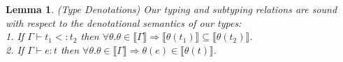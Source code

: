 \documentclass[11pt]{article}
\newtheorem{lemma}[theorem]{Lemma}
\newcommand{\bind}{\hspace{0.1em}{:}\hspace{0.1em}} %
\newcommand{\col}{\mathbin{:}}       %
\newcommand{\lb}{\llbracket}         %
\newcommand{\rb}{\rrbracket}         %
\newcommand{\many}{\hookrightarrow^*}
\newcommand{\true}{\mathtt{true}}
\begin{document}
\begin{lemma}{ (Type Denotations) Our typing and subtyping relations are sound with respect to the denotational semantics of our types:\\
1. If $\Gamma \vdash t_1 <: t_2$ then $\forall \theta. \theta \in \lb \Gamma \rb \Rightarrow \lb\theta(t_1)\rb \subseteq \lb\theta(t_2)\rb$.\\
2. If $\Gamma \vdash e : t$ then $\forall \theta. \theta \in \lb \Gamma \rb \Rightarrow \theta(e) \in \lb\theta(t)\rb.$
}	
\end{lemma}

\begin{comment}
\begin{proof}
(1) Suppose $\Gamma \vdash t_1 <: t_2$. We proceed by induction on the derivation tree of the subtyping relation.

{\bf Case} $\textsc{Sub-Base}$: We have that 
$\Gamma \vdash b\{v_1\col p_1\} <: b\{v_2\col p_2\}$ where $t_1 \equiv b\{v_1\col p_1\}$ and $t_2 \equiv b\{v_2\col p_2\}$.
By inversion, 
\[\Gamma; v_1\bind b\{v_1\col p_1\} \vdash p_2[v_1/v_2].\] 
By inversion of {\sc Ent-Ext} we have 
\begin{equation}\Gamma \vdash \forall\, v_1\bind b.\, p_1 \Rightarrow p_2[v_1/v_2]
.\end{equation}
We need to show $\forall \theta.\; 
\theta \in \lb \Gamma \rb \Rightarrow 
\lb\theta(b\{v_1:p_1\})\rb \subseteq \lb\theta(b\{v_2:p_2\})\rb.$
Equivalently,
\begin{align}
\forall\theta.\,\theta\in\lb\Gamma\rb \Rightarrow&
\{ e \,|\, \varnothing \vdash_B e:b \;\wedge\; 
  ({\rm if}\, e \many v \,{\rm then}\, \theta(p_1[v/v_1]) \many \true)\}\\
\subseteq &\{ e \,|\, \varnothing \vdash_B e:b \;\wedge\; 
  ({\rm if}\, e \many v \,{\rm then}\, \theta(p_2[v/v_2]) \many \true)\}
\end{align}
Let $\theta \in \lb\Gamma\rb$ be a closing substitution and
let $e$ a term in set (2), and suppose $e \many v$. Then $\theta(p_1[v/v_1]) \many \true$. 
Validity of the implication (1) is defined by the property that for all closing substitutions $\theta'$ in the denotation of $\Gamma$ extended by $v_1 : b$ ($v_1$ is the variable being universally quantified over in (1)) we have that if $\theta'(p_1) \many \true$ then $\theta'(p_2[v_1/v_2]) \many \true$. That is,
\begin{equation}
\forall\theta'.\, \theta' \in \lb\Gamma,v_1:b\rb \Rightarrow
(\theta'(p_1) \many \true) \Rightarrow (\theta'(p_2[v_1/v_2]) \many \true)
\end{equation}


\end{comment}
\end{document}

